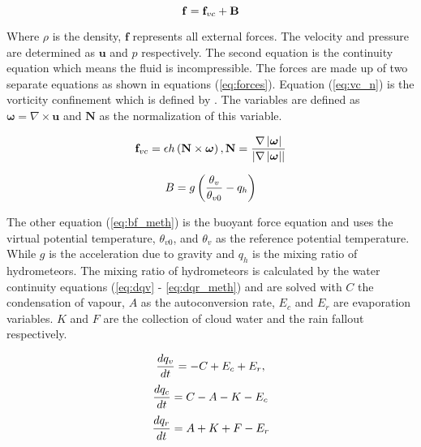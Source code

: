 \begin{equation} \label{eq:forces}
  \centering
  \mathbf{f} = \mathbf{f}_{vc} + \mathbf{B}
\end{equation}

Where $\rho$ is the density, $\mathbf{f}$ represents all external forces.
The velocity and pressure are determined as $\mathbf{u}$ and $p$ respectively.
The second equation is the continuity equation which means the fluid is incompressible.
The forces are made up of two separate equations as shown in equations (\ref{eq:forces}).
Equation (\ref{eq:vc_n}) is the vorticity confinement which is defined by \citet{HarrisEtAl03}.
The variables are defined as $\boldsymbol{\omega} = \nabla\times\mathbf{u}$ and $\mathbf{N}$ as the normalization of this variable. 

\begin{equation} \label{eq:vc_n}
  \centering
  \mathbf{f}_{vc} = \epsilon h\left(\mathbf{N}\times\boldsymbol{\omega}\right), \mathbf{N} = \frac{\nabla\left|\boldsymbol{\omega}\right|}{\left|\nabla\left|\boldsymbol{\omega}\right|\right|}
\end{equation}

\begin{equation} \label{eq:bf_meth}
  \centering
  B = g\left(\frac{\theta_{v}}{\theta_{v0}} - q_{h}\right)
\end{equation}

The other equation (\ref{eq:bf_meth}) is the buoyant force equation and uses the virtual potential temperature, $\theta_{v0}$, and $\theta_{v}$ as the reference potential temperature.
While $g$ is the acceleration due to gravity and $q_{h}$ is the mixing ratio of hydrometeors.
The mixing ratio of hydrometeors is calculated by the water continuity equations (\ref{eq:dqv} - \ref{eq:dqr_meth}) and are solved with $C$ the condensation of vapour, $A$ as the autoconversion rate, $E_{c}$ and $E_{r}$ are evaporation variables.
$K$ and $F$ are the collection of cloud water and the rain fallout respectively.

\begin{equation} \label{eq:dqv_meth}
  \centering
  \frac{dq_{v}}{dt} = - C + E_{c} + E_{r}, 
\end{equation}
\begin{equation} \label{eq:dqc_meth}
  \centering
  \frac{dq_{c}}{dt} = C - A - K - E_{c}
\end{equation}
\begin{equation} \label{eq:dqr_meth}
  \centering
  \frac{dq_{r}}{dt} = A + K + F - E_{r}
\end{equation}

